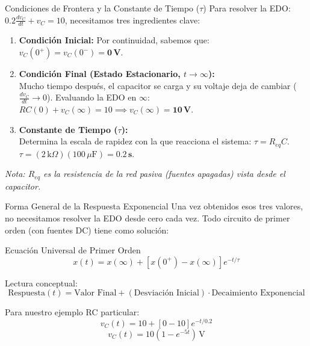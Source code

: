 \documentclass[aspectratio=169, 10pt]{beamer}
\begin{document}
\begin{frame}{Condiciones de Frontera y la Constante de Tiempo ($\tau$)}
    Para resolver la EDO: $0.2 \frac{dv_C}{dt} + v_C = 10$, necesitamos tres ingredientes clave:
    \vspace{0.2cm}
    
    \begin{enumerate}
        \item \textbf{Condición Inicial:} Por continuidad, sabemos que: \\
        $v_C(0^+) = v_C(0^-) = \mathbf{0\,\text{V}}$.
        
        \item \textbf{Condición Final (Estado Estacionario, $t \to \infty$):} \\ 
        Mucho tiempo después, el capacitor se carga y su voltaje deja de cambiar ($\frac{dv_C}{dt} \to 0$). Evaluando la EDO en $\infty$: \\
        $RC (0) + v_C(\infty) = 10 \implies v_C(\infty) = \mathbf{10\,\text{V}}$.
        
        \item \textbf{Constante de Tiempo ($\tau$):} \\
        Determina la escala de rapidez con la que reacciona el sistema: $\tau = R_{eq} C$. \\
        $\tau = (2\,\text{k}\Omega)(100\,\mu\text{F}) = \mathbf{0.2\,\text{s}}$.
    \end{enumerate}
    
    \vspace{0.2cm}
    \textit{Nota: $R_{eq}$ es la resistencia de la red pasiva (fuentes apagadas) vista desde el capacitor.}
\end{frame}

\begin{frame}{Forma General de la Respuesta Exponencial}
    Una vez obtenidos esos tres valores, no necesitamos resolver la EDO desde cero cada vez. Todo circuito de primer orden (con fuentes DC) tiene como solución:
    
    \begin{block}{Ecuación Universal de Primer Orden}
        $$x(t) = x(\infty) + \left[ x(0^+) - x(\infty) \right] e^{-t/\tau}$$
    \end{block}
    
    Lectura conceptual:
    $$\text{Respuesta}(t) = \text{Valor Final} + (\text{Desviación Inicial}) \cdot \text{Decaimiento Exponencial}$$
    
    Para nuestro ejemplo RC particular:
    $$v_C(t) = 10 + [0 - 10] e^{-t/0.2}$$
    $$v_C(t) = 10 (1 - e^{-5t}) \, \text{V}$$
\end{frame}
\end{document}
